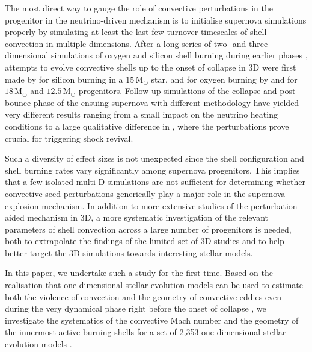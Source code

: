 \documentclass[useAMS,usenatbib]{mnras}
\newcommand{\Msun}{\ensuremath{\mathrm{M}_\odot}}
\begin{document}
The most direct way to gauge the role of convective perturbations in
the progenitor in the neutrino-driven mechanism is to initialise
supernova simulations properly by simulating at least the last few
turnover timescales of shell convection in multiple dimensions. After
a long series of two- and three-dimensional simulations of oxygen and
silicon shell burning during earlier phases
\citep{arnett_94,bazan_94,bazan_98,asida_00,kuhlen_03,meakin_06,meakin_07,meakin_07_b,arnett_11,jones_17},
attempts to evolve convective shells up to the onset of collapse in 3D
were first made by \citet{couch_15} for silicon burning in a $15
\,\Msun$ star, and for oxygen burning by \citet{mueller_16c} and
\citet{mueller_16b} for $18 \,\Msun$ and $12.5 \,\Msun$
progenitors. Follow-up simulations of the collapse and post-bounce
phase of the ensuing supernova with different methodology have yielded
very different results ranging from a  small impact on the
neutrino heating conditions \citep{couch_15} to a large qualitative
difference in \citet{mueller_17}, where the perturbations prove crucial
for triggering shock revival.

Such a diversity of effect sizes is not unexpected since the shell
configuration and shell burning rates vary significantly among
supernova progenitors. This implies that a few isolated multi-D
simulations are not sufficient for determining whether convective seed
perturbations generically play a major role in the supernova explosion
mechanism. In addition to more extensive studies of the perturbation-aided
mechanism in 3D, a more systematic investigation of the relevant
parameters of shell convection across a large number of progenitors
is needed, both to extrapolate the findings of the limited set of 3D studies and to help better target the 3D simulations towards interesting stellar models.

In this paper, we undertake such a study for the first time.  Based on
the realisation that one-dimensional stellar evolution models can be
used to estimate both the violence of convection and the geometry of
convective eddies even during the very dynamical phase right before
the onset of collapse \citep{mueller_16c}, we investigate the
systematics of the convective Mach number and the geometry of the
innermost active burning shells for a set of 2,353 one-dimensional
stellar evolution models \citep{mueller_16a}. 
\end{document}
